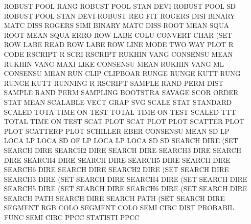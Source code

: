 ROBUST   POOL RANG                      ROBUST   POOL STAN DEVI
ROBUST   POOL SD                        ROBUST   POOL STAN DEVI
ROBUST   REG                            FIT
ROGERS   DISI                           BINARY   MATC DISS
ROGERS   SIMI                           BINARY   MATC DISS
ROOT     MEAN SQUA                      ROOT     MEAN SQUA ERRO
ROW      LABE COLU                      CONVERT  CHAR (SET
ROW      LABE                           READ     ROW  LABE
ROW      LINE MODE                      TWO      WAY  PLOT
R        CODE                           RSCRIPT
R        SCRI                           RSCRIPT
RUKHIN   VANG                           CONSENSU MEAN
RUKHIN   VANG MAXI LIKE                 CONSENSU MEAN
RUKHIN   VANG ML                        CONSENSU MEAN
RUN      CLIP                           CLIPBOAR
RUNGE                                   RUNGE    KUTT
RUNG                                    RUNGE    KUTT
RUNNING  R                              RSCRIPT
SAMPLE   RAND PERM DIST                 SAMPLE   RAND PERM
SAMPLING                                BOOTSTRA
SAVAGE   SCOR                           ORDER    STAT MEAN
SCALABLE VECT GRAP                      SVG
SCALE    STAT                           STANDARD
SCALED   TOTA TIME ON   TEST            TOTAL    TIME ON   TEST
SCALED   TTT                            TOTAL    TIME ON   TEST
SCAT                                    PLOT
SCAT     PLOT                           PLOT
SCATTER  PLOT                           PLOT
SCATTERP                                PLOT
SCHILLER EBER                           CONSENSU MEAN
SD       LP   LOCA                      LP       LOCA
SD       OF   LP   LOCA                 LP       LOCA
SD                                      SD
SEARCH   DIRE (SET                      SEARCH   DIRE
SEARCH2  DIRE                           SEARCH   DIRE
SEARCH3  DIRE                           SEARCH   DIRE
SEARCH4  DIRE                           SEARCH   DIRE
SEARCH5  DIRE                           SEARCH   DIRE
SEARCH6  DIRE                           SEARCH   DIRE
SEARCH2  DIRE (SET                      SEARCH   DIRE
SEARCH3  DIRE (SET                      SEARCH   DIRE
SEARCH4  DIRE (SET                      SEARCH   DIRE
SEARCH5  DIRE (SET                      SEARCH   DIRE
SEARCH6  DIRE (SET                      SEARCH   DIRE
SEARCH   PATH                           SEARCH   DIRE
SEARCH   PATH (SET                      SEARCH   DIRE
SEGMENT  RGB  COLO                      SEGMENT  COLO
SEMI     CIRC DIST                      PROBABIL FUNC
SEMI     CIRC PPCC                      STATISTI PPCC
